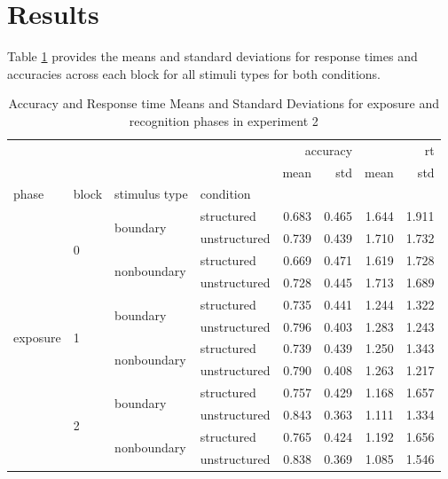 \section{Results}
Table \ref{tab:exp2-rt-accuracy-stats} provides the means and standard deviations for response times and accuracies across each block for all stimuli types for both conditions. 
\begin{table}
    \centering
    \label{tab:exp2-rt-accuracy-stats}
    \caption{Accuracy and Response time Means and Standard Deviations for exposure and recognition phases in experiment 2}    
    \begin{tabular}{llllrrrr}
        \toprule
         &  &  &  & \multicolumn{2}{r}{accuracy} & \multicolumn{2}{r}{rt} \\
         &  &  &  & mean & std & mean & std \\
        phase & block & stimulus type & condition &  &  &  &  \\
        \midrule
        \multirow[t]{12}{*}{exposure} & \multirow[t]{4}{*}{0} & \multirow[t]{2}{*}{boundary} & structured & 0.683 & 0.465 & 1.644 & 1.911 \\
         &  &  & unstructured & 0.739 & 0.439 & 1.710 & 1.732 \\
        \cline{3-8}
         &  & \multirow[t]{2}{*}{nonboundary} & structured & 0.669 & 0.471 & 1.619 & 1.728 \\
         &  &  & unstructured & 0.728 & 0.445 & 1.713 & 1.689 \\
        \cline{2-8} \cline{3-8}
         & \multirow[t]{4}{*}{1} & \multirow[t]{2}{*}{boundary} & structured & 0.735 & 0.441 & 1.244 & 1.322 \\
         &  &  & unstructured & 0.796 & 0.403 & 1.283 & 1.243 \\
        \cline{3-8}
         &  & \multirow[t]{2}{*}{nonboundary} & structured & 0.739 & 0.439 & 1.250 & 1.343 \\
         &  &  & unstructured & 0.790 & 0.408 & 1.263 & 1.217 \\
        \cline{2-8} \cline{3-8}
         & \multirow[t]{4}{*}{2} & \multirow[t]{2}{*}{boundary} & structured & 0.757 & 0.429 & 1.168 & 1.657 \\
         &  &  & unstructured & 0.843 & 0.363 & 1.111 & 1.334 \\
        \cline{3-8}
         &  & \multirow[t]{2}{*}{nonboundary} & structured & 0.765 & 0.424 & 1.192 & 1.656 \\
         &  &  & unstructured & 0.838 & 0.369 & 1.085 & 1.546 \\

\end{tabular}
\end{table}
